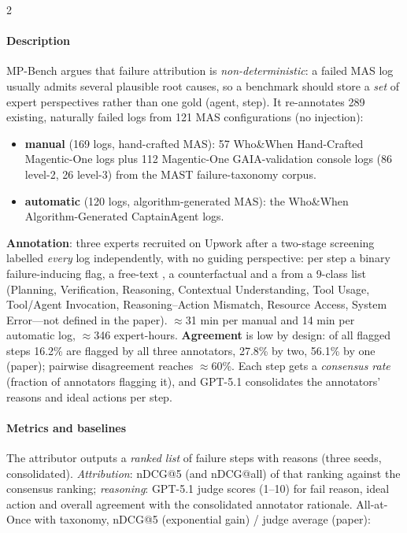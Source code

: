 \begin{multicols}{2}
\paragraph{Description} MP-Bench argues that failure attribution is \emph{non-deterministic}: a failed MAS log usually admits several plausible root causes, so a benchmark should store a \emph{set} of expert perspectives rather than one gold (agent, step). It re-annotates 289 existing, naturally failed logs from 121 MAS configurations (no injection):
\begin{itemize}
\item \textbf{manual} (169 logs, hand-crafted MAS): 57 Who\&When Hand-Crafted Magentic-One logs plus 112 Magentic-One GAIA-validation console logs (86 level-2, 26 level-3) from the MAST failure-taxonomy corpus.
\item \textbf{automatic} (120 logs, algorithm-generated MAS): the Who\&When Algorithm-Generated CaptainAgent logs.
\end{itemize}
\textbf{Annotation}: three experts recruited on Upwork after a two-stage screening labelled \emph{every} log independently, with no guiding perspective: per step a binary failure-inducing flag, a free-text , a counterfactual  and a  from a 9-class list (Planning, Verification, Reasoning, Contextual Understanding, Tool Usage, Tool/Agent Invocation, Reasoning--Action Mismatch, Resource Access, System Error---not defined in the paper). $\approx$31 min per manual and 14 min per automatic log, $\approx$346 expert-hours. \textbf{Agreement} is low by design: of all flagged steps 16.2\% are flagged by all three annotators, 27.8\% by two, 56.1\% by one (paper); pairwise disagreement reaches $\approx$60\%. Each step gets a \emph{consensus rate} (fraction of annotators flagging it), and GPT-5.1 consolidates the annotators' reasons and ideal actions per step.

\paragraph{Metrics and baselines} The attributor outputs a \emph{ranked list} of failure steps with reasons (three seeds, consolidated). \emph{Attribution}: nDCG@5 (and nDCG@all) of that ranking against the consensus ranking; \emph{reasoning}: GPT-5.1 judge scores (1--10) for fail reason, ideal action and overall agreement with the consolidated annotator rationale. All-at-Once with taxonomy, nDCG@5 (exponential gain) / judge average (paper):


\end{multicols}
